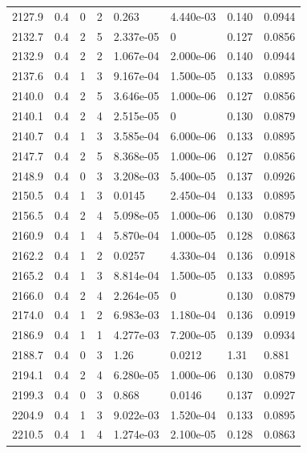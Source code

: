 \documentclass[preview]{standalone}
\begin{document}
{{{{{{{{\begin{tabular}{L{1.2cm}C{1.2cm} C{0.3cm}C{0.5cm} C{1.4cm}C{1.4cm} C{1.4cm}C{1.4cm}}
  2127.9  &   0.4  & 0     &  2 &  0.263  & 4.440e-03  & 0.140 &  0.0944   \\ 
  2132.7  &   0.4  & 2     &  5 &  2.337e-05  & 0  & 0.127 &  0.0856   \\ 
  2132.9  &   0.4  & 2     &  2 &  1.067e-04  & 2.000e-06  & 0.140 &  0.0944   \\ 
  2137.6  &   0.4  & 1     &  3 &  9.167e-04  & 1.500e-05  & 0.133 &  0.0895   \\ 
  2140.0  &   0.4  & 2     &  5 &  3.646e-05  & 1.000e-06  & 0.127 &  0.0856   \\ 
  2140.1  &   0.4  & 2     &  4 &  2.515e-05  & 0  & 0.130 &  0.0879   \\ 
  2140.7  &   0.4  & 1     &  3 &  3.585e-04  & 6.000e-06  & 0.133 &  0.0895   \\ 
  2147.7  &   0.4  & 2     &  5 &  8.368e-05  & 1.000e-06  & 0.127 &  0.0856   \\ 
  2148.9  &   0.4  & 0     &  3 &  3.208e-03  & 5.400e-05  & 0.137 &  0.0926   \\ 
  2150.5  &   0.4  & 1     &  3 &  0.0145  & 2.450e-04  & 0.133 &  0.0895   \\ 
  2156.5  &   0.4  & 2     &  4 &  5.098e-05  & 1.000e-06  & 0.130 &  0.0879   \\ 
  2160.9  &   0.4  & 1     &  4 &  5.870e-04  & 1.000e-05  & 0.128 &  0.0863   \\ 
  2162.2  &   0.4  & 1     &  2 &  0.0257  & 4.330e-04  & 0.136 &  0.0918   \\ 
  2165.2  &   0.4  & 1     &  3 &  8.814e-04  & 1.500e-05  & 0.133 &  0.0895   \\ 
  2166.0  &   0.4  & 2     &  4 &  2.264e-05  & 0  & 0.130 &  0.0879   \\ 
  2174.0  &   0.4  & 1     &  2 &  6.983e-03  & 1.180e-04  & 0.136 &  0.0919   \\ 
  2186.9  &   0.4  & 1     &  1 &  4.277e-03  & 7.200e-05  & 0.139 &  0.0934   \\ 
  2188.7  &   0.4  & 0     &  3 &  1.26  & 0.0212  & 1.31 &  0.881   \\ 
  2194.1  &   0.4  & 2     &  4 &  6.280e-05  & 1.000e-06  & 0.130 &  0.0879   \\ 
  2199.3  &   0.4  & 0     &  3 &  0.868  & 0.0146  & 0.137 &  0.0927   \\ 
  2204.9  &   0.4  & 1     &  3 &  9.022e-03  & 1.520e-04  & 0.133 &  0.0895   \\ 
  2210.5  &   0.4  & 1     &  4 &  1.274e-03  & 2.100e-05  & 0.128 &  0.0863   \\ 

\end{tabular}}}}}}}}}
\end{document}
